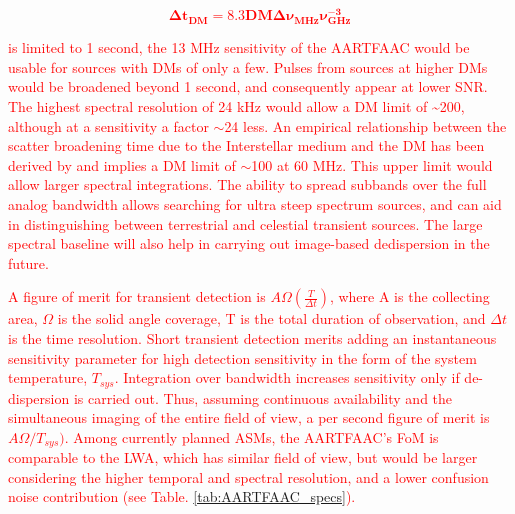 \documentclass{aa}
\begin{document}
\textcolor{red}{
\begin{equation}
\mathbf{\Delta t_{DM}=8.3DM\Delta\nu_{MHz}\nu_{GHz}^{-3}}\label{eq:datamodel-1}
\end{equation}
}

\textcolor{red}{is limited to 1 second, the 13 MHz sensitivity of
the AARTFAAC would be usable for sources with DMs of only a few. Pulses
from sources at higher DMs would be broadened beyond 1 second, and
consequently appear at lower SNR. The highest spectral resolution
of 24 kHz would allow a DM limit of \textasciitilde{}200, although
at a sensitivity a factor $\sim$24 less. An empirical relationship
between the scatter broadening time due to the Interstellar medium
and the DM has been derived by \cite{bhat2004multifrequency} and
implies a DM limit of $\sim$100 at 60 MHz. This upper limit would
allow larger spectral integrations. The ability to spread subbands
over the full analog bandwidth allows searching for ultra steep spectrum
sources, and can aid in distinguishing between terrestrial and celestial
transient sources. The large spectral baseline will also help in carrying
out image-based dedispersion in the future.}

\textcolor{red}{A figure of merit for transient detection\cite{cordes2004dynamic}
is $A\Omega\left(\frac{T}{\Delta t}\right)$, where A is the collecting
area, $\Omega$ is the solid angle coverage, T is the total duration
of observation, and $\Delta t$ is the time resolution. Short transient
detection merits adding an instantaneous sensitivity parameter for
high detection sensitivity in the form of the system temperature,
$T_{sys}$. Integration over bandwidth increases sensitivity only
if de-dispersion is carried out. Thus, assuming continuous availability
and the simultaneous imaging of the entire field of view, a per second
figure of merit is $A\Omega/T_{sys})$. Among currently planned ASMs,
the AARTFAAC's FoM is comparable to the LWA, which has similar field
of view, but would be larger considering the higher temporal and spectral
resolution, and a lower confusion noise contribution (see Table. \ref{tab:AARTFAAC_specs}). }
\end{document}
